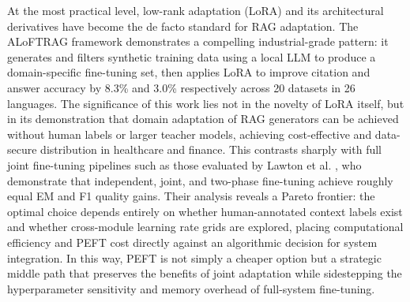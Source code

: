 \documentclass[11pt,a4paper]{article}
\begin{document}
At the most practical level, low-rank adaptation (LoRA) and its architectural derivatives have become the de facto standard for RAG adaptation. The ALoFTRAG framework \cite{arxiv:2501.11929v1} demonstrates a compelling industrial-grade pattern: it generates and filters synthetic training data using a local LLM to produce a domain-specific fine-tuning set, then applies LoRA to improve citation and answer accuracy by 8.3\% and 3.0\% respectively across 20 datasets in 26 languages. The significance of this work lies not in the novelty of LoRA itself, but in its demonstration that domain adaptation of RAG generators can be achieved without human labels or larger teacher models, achieving cost-effective and data-secure distribution in healthcare and finance. This contrasts sharply with full joint fine-tuning pipelines such as those evaluated by Lawton et al. \cite{arxiv:2510.01600v2}, who demonstrate that independent, joint, and two-phase fine-tuning achieve roughly equal EM and F1 quality gains. Their analysis reveals a Pareto frontier: the optimal choice depends entirely on whether human-annotated context labels exist and whether cross-module learning rate grids are explored, placing computational efficiency and PEFT cost directly against an algorithmic decision for system integration. In this way, PEFT is not simply a cheaper option but a strategic middle path that preserves the benefits of joint adaptation while sidestepping the hyperparameter sensitivity and memory overhead of full-system fine-tuning.
\end{document}
